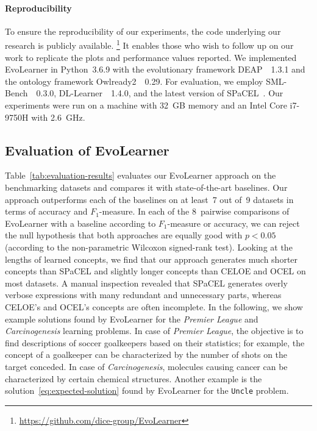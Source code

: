 \paragraph{Reproducibility}
To ensure the reproducibility of our experiments, the code underlying our research is publicly available.%
\footnote{\url{https://github.com/dice-group/EvoLearner}}
It enables those who wish to follow up on our work to replicate the plots and performance values reported.
We implemented EvoLearner in Python~3.6.9 with the evolutionary framework DEAP~\citep{Fortin2012DEAP}~1.3.1  and the ontology framework Owlready2~\citep{Lamy2017OWL}~0.29. For evaluation, we employ SML-Bench~\citep{Westphal2019SML-Bench}~0.3.0, DL-Learner~\citep{Lehmann2009DL-Learner}~1.4.0, and the latest version of SPaCEL~\citep{Tran2017Parallel}. Our experiments were run on a machine with 32~GB memory and an Intel Core i7-9750H with 2.6~GHz.

\subsection{Evaluation of EvoLearner}%
\label{subsec:evaluation-best-approach}



Table~\ref{tab:evaluation-results} evaluates our EvoLearner approach on the benchmarking datasets and compares it with state-of-the-art baselines. Our approach outperforms each of the baselines on at least~7 out of~9 datasets in terms of accuracy and $F_1$-measure. In each of the 8~pairwise comparisons of EvoLearner with a baseline according to $F_1$-measure or accuracy, we can reject the null hypothesis that both approaches are equally good with $p < 0.05$ (according to the non-parametric Wilcoxon signed-rank test). Looking at the lengths of learned concepts, we find that our approach generates much shorter concepts than SPaCEL and slightly longer concepts than CELOE and OCEL on most datasets. A manual inspection revealed that \mbox{SPaCEL} generates overly verbose expressions with many redundant and unnecessary parts, whereas CELOE's and OCEL's concepts are often incomplete. In the following, we show example solutions found by EvoLearner for the \textit{Premier League} and \textit{Carcinogenesis} learning problems. In case of \textit{Premier League}, the objective is to find descriptions of soccer goalkeepers based on their statistics; for example, the concept of a goalkeeper can be characterized by the number of shots on the target conceded. In case of \textit{Carcinogenesis}, molecules causing cancer can be characterized by certain chemical structures. Another example is the solution~\eqref{eq:expected-solution} found by EvoLearner for the \texttt{Uncle} problem.

